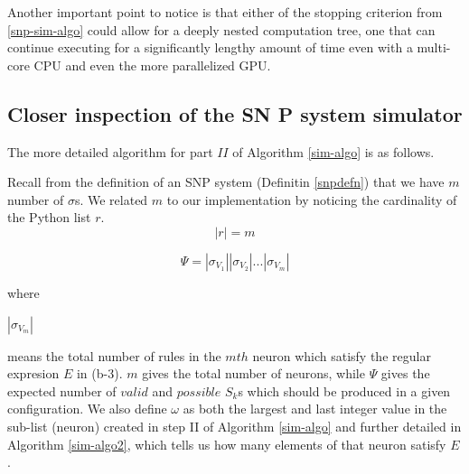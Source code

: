 \documentclass{svmultm}
\newcommand{\sredmark}[2]{\color{red} \sout{#1} #2 \color{black}}
\begin{document}
Another
important point to notice is that either of the stopping
criterion from \ref{snp-sim-algo} could allow for a deeply nested computation tree,
one that can continue executing for a significantly lengthy amount of
time even with a multi-core CPU and even the more parallelized
 {GPU}.

\subsection{Closer inspection of the SN P system
simulator}\label{siminspect}
	
The more detailed algorithm for part $II$ of Algorithm \ref{sim-algo} is as follows.


Recall from the definition of an SNP system (Definitin \ref{snpdefn}) that we have $m$ number of $\sigma$s. We related $m$ to our implementation by noticing the cardinality of the Python list $r$.
\begin{equation}\label{rcard}
|r| = m
\end{equation}

{
\begin{equation}\label{psi}
\Psi = |{\sigma_{V_1}}| |{\sigma_{V_2}}| ...|{\sigma_{V_m}}|
\end{equation}
}

where

$|{\sigma_{V_m}}|$

means the total number of rules in the $mth$ neuron which satisfy the regular expresion $E$ in (b-3). $m$ gives the total number of neurons, while $\Psi$ gives the expected number of $valid$ and $possible$ $S_k$s which should be produced in a given configuration.
We also define $\omega$ as both the largest and last integer value in the sub-list (neuron) created in step II of Algorithm \ref{sim-algo} and further detailed in Algorithm \ref{sim-algo2}, which tells us how many elements of that neuron satisfy $E$.
\end{document}
